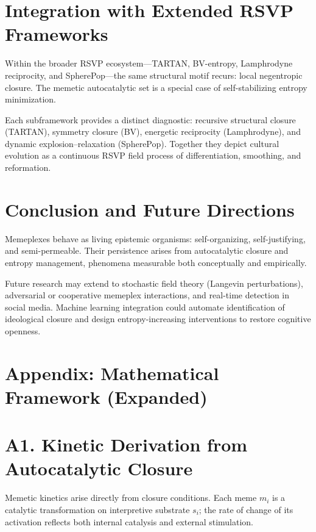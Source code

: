 \documentclass[11pt,a4paper]{article}
\newenvironment{narrative}{\begin{itshape}}{\end{itshape}}
\begin{document}
\section{Integration with Extended RSVP Frameworks}
\begin{narrative}
Within the broader RSVP ecosystem—TARTAN, BV-entropy, Lamphrodyne reciprocity, and SpherePop—the same structural motif recurs: local negentropic closure.  The memetic autocatalytic set is a special case of self-stabilizing entropy minimization.
\end{narrative}

Each subframework provides a distinct diagnostic: recursive structural closure (TARTAN), symmetry closure (BV), energetic reciprocity (Lamphrodyne), and dynamic explosion–relaxation (SpherePop).  
Together they depict cultural evolution as a continuous RSVP field process of differentiation, smoothing, and reformation.

\section{Conclusion and Future Directions}
\begin{narrative}
Memeplexes behave as living epistemic organisms: self-organizing, self-justifying, and semi-permeable.  Their persistence arises from autocatalytic closure and entropy management, phenomena measurable both conceptually and empirically.
\end{narrative}

Future research may extend to stochastic field theory (Langevin perturbations), adversarial or cooperative memeplex interactions, and real-time detection in social media.  
Machine learning integration could automate identification of ideological closure and design entropy-increasing interventions to restore cognitive openness.

\appendix
\section*{Appendix: Mathematical Framework (Expanded)}

\section{A1. Kinetic Derivation from Autocatalytic Closure}
\begin{narrative}
Memetic kinetics arise directly from closure conditions.  Each meme \(m_i\) is a catalytic transformation on interpretive substrate \(s_i\); the rate of change of its activation reflects both internal catalysis and external stimulation.
\end{narrative}
\end{document}
